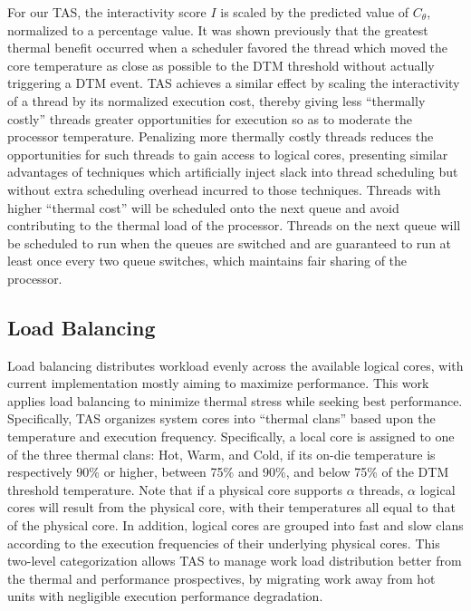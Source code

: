 \documentclass[times, 10pt,twocolumn]{IEEEtran}
\begin{document}
For our TAS, the interactivity score $I$ is scaled by the predicted
value of $C_{\theta}$, normalized to a percentage value.  It was shown
previously \cite{Zhou2010b} that the greatest thermal benefit occurred
when a scheduler favored the thread which moved the core temperature as
close as possible to the DTM threshold without actually triggering a DTM
event.  TAS achieves a similar effect by scaling the interactivity of a
thread by its normalized execution cost, thereby giving less ``thermally
costly'' threads greater opportunities for execution so as to moderate
the processor temperature.  Penalizing more thermally costly threads
reduces the opportunities for such threads to gain access to logical
cores, presenting similar advantages of techniques which artificially
inject slack into thread scheduling but without extra scheduling
overhead incurred to those techniques.  Threads  with higher ``thermal
cost'' will be scheduled onto the next queue and avoid contributing to
the thermal load of the processor.   Threads on the next queue will be
scheduled to run when the queues are switched and are guaranteed to run
at least once every two queue switches, which maintains fair sharing of
the processor.

\subsection{Load Balancing}
\label{sec:loadbalance} 
Load balancing distributes workload evenly across the available logical
cores, with current implementation mostly aiming to maximize
performance.  This work applies load balancing to minimize thermal
stress while seeking best performance.  Specifically, TAS organizes
system cores into ``thermal clans'' based upon the temperature and
execution frequency.  Specifically, a local core is assigned to one of
the three thermal clans: Hot, Warm, and Cold, if its on-die temperature
is respectively 90\% or higher, between 75\% and 90\%, and below 75\% of
the DTM threshold temperature.  Note that if a physical core supports
$\alpha$ threads, $\alpha$ logical cores will result from the physical
core, with their temperatures all equal to that of the physical core.
In addition, logical cores are grouped into fast and slow clans
according to the execution frequencies of their underlying physical
cores.  This two-level categorization allows TAS to manage work load
distribution better from the thermal and performance prospectives, by
migrating work away from hot units with negligible execution performance
degradation.
\end{document}
